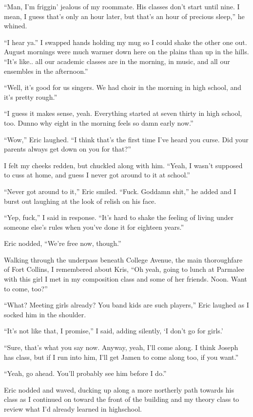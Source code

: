 ``Man, I'm friggin' jealous of my roommate.  His classes don't start until nine.  I mean, I guess that's only an hour later, but that's an hour of precious sleep,'' he whined.

``I hear ya.''  I swapped hands holding my mug so I could shake the other one out.  August mornings were much warmer down here on the plains than up in the hills.  ``It's like.. all our academic classes are in the morning, in music, and all our ensembles in the afternoon.''

``Well, it's good for us singers.  We had choir in the morning in high school, and it's pretty rough.''

``I guess it makes sense, yeah.  Everything started at seven thirty in high school, too.  Dunno why eight in the morning feels so damn early now.''

``Wow,'' Eric laughed.  ``I think that's the first time I've heard you curse.  Did your parents always get down on you for that?''

I felt my cheeks redden, but chuckled along with him.  ``Yeah, I wasn't supposed to cuss at home, and guess I never got around to it at school.''

``Never got around to it,'' Eric smiled.  ``Fuck.  Goddamn shit,'' he added and I burst out laughing at the look of relish on his face.

``Yep, fuck,'' I said in response.  ``It's hard to shake the feeling of living under someone else's rules when you've done it for eighteen years.''

Eric nodded, ``We're free now, though.''

Walking through the underpass beneath College Avenue, the main thoroughfare of Fort Collins, I remembered about Kris, ``Oh yeah, going to lunch at Parmalee with this girl I met in my composition class and some of her friends.  Noon.  Want to come, too?''

``What?  Meeting girls already?  You band kids are such players,'' Eric laughed as I socked him in the shoulder.

``It's not like that, I promise,'' I said, adding silently, `I don't go for girls.'

``Sure, that's what you say now.  Anyway, yeah, I'll come along.  I think Joseph has class, but if I run into him, I'll get Jamen to come along too, if you want.''

``Yeah, go ahead.  You'll probably see him before I do.''

Eric nodded and waved, ducking up along a more northerly path towards his class as I continued on toward the front of the building and my theory class to review what I'd already learned in highschool.

